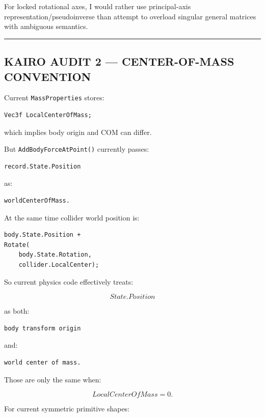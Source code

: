 For locked rotational axes, I would rather use principal-axis representation/pseudoinverse than attempt to overload singular general matrices with ambiguous semantics.

\begin{center}\rule{0.5\linewidth}{0.5pt}\end{center}

\subsection{KAIRO AUDIT 2 --- CENTER-OF-MASS CONVENTION}\label{06-engine-ii-ch035-kairo-audit-2-center-of-mass-convention}

Current \texttt{MassProperties} stores:

\begin{verbatim}
Vec3f LocalCenterOfMass;
\end{verbatim}

which implies body origin and COM can differ.

But \texttt{AddBodyForceAtPoint()} currently passes:

\begin{verbatim}
record.State.Position
\end{verbatim}

as:

\begin{verbatim}
worldCenterOfMass.
\end{verbatim}

At the same time collider world position is:

\begin{verbatim}
body.State.Position +
Rotate(
    body.State.Rotation,
    collider.LocalCenter);
\end{verbatim}

So current physics code effectively treats:

\[
State.Position
\]

as both:

\begin{verbatim}
body transform origin
\end{verbatim}

and:

\begin{verbatim}
world center of mass.
\end{verbatim}

Those are only the same when:

\[
LocalCenterOfMass=0.
\]

For current symmetric primitive shapes:


